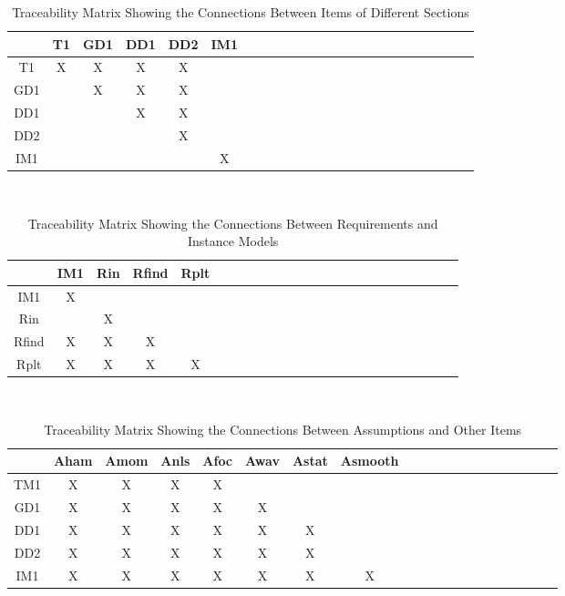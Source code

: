 \documentclass[12pt]{article}
\begin{document}
\begin{table}[h!]
\centering
\begin{tabular}{|c|c|c|c|c|c|c|c|c|c|c|c|c|c|c|c|c|c|c|c|c|c|c|c|}
\hline        
	& T1& GD1& DD1 & DD2&IM1 \\
\hline
T1     &X &X &X &X &  \\ \hline
GD1    & &X &X &X & \\ \hline
DD1    & & &X &X & \\ \hline 
DD2    & & & &X &   \\ \hline 
IM1    & & & & &X \\
\hline
\end{tabular}\\
\caption{Traceability Matrix Showing the Connections Between Items of 
Different 
Sections}
\label{Table:B_trace}
\end{table}

\begin{table}[h!]
	\centering
	\begin{tabular}{|c|c|c|c|c|c|c|c|c|c|c|c|c|c|c|c|c|c|c|c|c|c|c|c|}
		\hline        
		& IM1& Rin& Rfind & Rplt  \\
		\hline
		IM1     &X & & &  \\ \hline
		Rin    & &X & &  \\ \hline
		Rfind    &X &X &X & \\ \hline 
		Rplt    &X &X &X &X   \\ 
		\hline
	\end{tabular}\\
	\caption{Traceability Matrix Showing the Connections Between Requirements 
	and Instance Models}
	\label{Table:R_trace}
\end{table} 

\newpage

	\begin{table}[h!]
		\centering
		\begin{tabular}{|c|c|c|c|c|c|c|c|c|c|c|c|c|c|c|c|c|c|c|c|}
			\hline
			& Aham & Amom& Anls& Afoc& Awav& Astat & Asmooth \\
			\hline
			TM1        &X &X &X &X && & \\ \hline
			GD1       &X &X &X &X &X && \\ \hline
			DD1       &X &X &X &X &X &X&\\ \hline
			DD2       &X  &X  &X  &X  &X &X& \\ \hline
			IM1       &X &X &X &X &X &X&X \\ 
			\hline
		\end{tabular}
		\caption{Traceability Matrix Showing the Connections Between 
		Assumptions and 
			Other Items}
		\label{Table:A_trace}
	\end{table}
\end{document}
